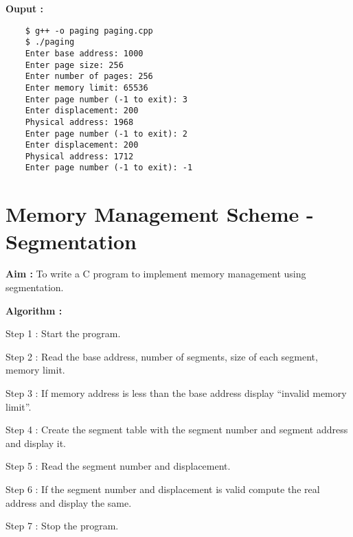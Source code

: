 \documentclass[journal,onecolumn]{IEEEtran}
\begin{document}
\textbf{Ouput :}
\begin{verbatim}
    $ g++ -o paging paging.cpp
    $ ./paging 
    Enter base address: 1000
    Enter page size: 256
    Enter number of pages: 256
    Enter memory limit: 65536
    Enter page number (-1 to exit): 3
    Enter displacement: 200
    Physical address: 1968
    Enter page number (-1 to exit): 2
    Enter displacement: 200
    Physical address: 1712
    Enter page number (-1 to exit): -1
\end{verbatim}


\section{Memory Management Scheme - Segmentation}
\textbf{Aim : } To write a C program to implement memory management using segmentation.

\textbf{Algorithm : }
\begin{list}{}{}
  \item Step 1 : Start the program.
  \item Step 2 : Read the base address, number of segments, size of each segment, memory limit.
  \item Step 3 : If memory address is less than the base address display “invalid memory limit”.
  \item Step 4 : Create the segment table with the segment number and segment address and
  display it.
  \item Step 5 : Read the segment number and displacement.
  \item Step 6 : If the segment number and displacement is valid compute the real address and
  display the same.
  \item Step 7 : Stop the program.
\end{list}
\end{document}
